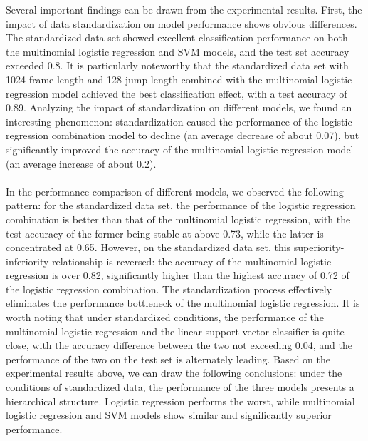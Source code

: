 \noindent Several important findings can be drawn from the experimental results. First, the impact of data standardization on model performance shows obvious differences. The standardized data set showed excellent classification performance on both the multinomial logistic regression and SVM models, and the test set accuracy exceeded 0.8. It is particularly noteworthy that the standardized data set with 1024 frame length and 128 jump length combined with the multinomial logistic regression model achieved the best classification effect, with a test accuracy of 0.89. Analyzing the impact of standardization on different models, we found an interesting phenomenon: standardization caused the performance of the logistic regression combination model to decline (an average decrease of about 0.07), but significantly improved the accuracy of the multinomial logistic regression model (an average increase of about 0.2).\\
\\
In the performance comparison of different models, we observed the following pattern: for the standardized data set, the performance of the logistic regression combination is better than that of the multinomial logistic regression, with the test accuracy of the former being stable at above 0.73, while the latter is concentrated at 0.65. However, on the standardized data set, this superiority-inferiority relationship is reversed: the accuracy of the multinomial logistic regression is over 0.82, significantly higher than the highest accuracy of 0.72 of the logistic regression combination. The standardization process effectively eliminates the performance bottleneck of the multinomial logistic regression. It is worth noting that under standardized conditions, the performance of the multinomial logistic regression and the linear support vector classifier is quite close, with the accuracy difference between the two not exceeding 0.04, and the performance of the two on the test set is alternately leading. Based on the experimental results above, we can draw the following conclusions: under the conditions of standardized data, the performance of the three models presents a hierarchical structure. Logistic regression performs the worst, while multinomial logistic regression and SVM models show similar and significantly superior performance.\\
\\
